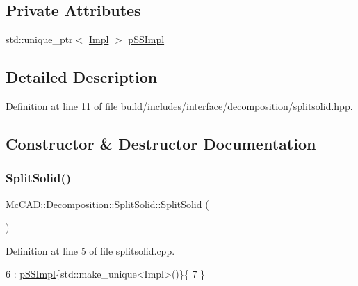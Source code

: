 \subsection*{Private Attributes}
\begin{DoxyCompactItemize}
\item 
std\+::unique\+\_\+ptr$<$ \hyperlink{classMcCAD_1_1Decomposition_1_1SplitSolid_1_1Impl}{Impl} $>$ \hyperlink{classMcCAD_1_1Decomposition_1_1SplitSolid_a9ae605a91ed830bea7ad866d758743ab}{p\+S\+S\+Impl}
\end{DoxyCompactItemize}


\subsection{Detailed Description}


Definition at line 11 of file build/includes/interface/decomposition/splitsolid.\+hpp.



\subsection{Constructor \& Destructor Documentation}
\mbox{\label{classMcCAD_1_1Decomposition_1_1SplitSolid_af0d38951f19a252ec24a48efa3d4a619}} 
\subsubsection{\texorpdfstring{Split\+Solid()}{SplitSolid()}\hspace{0.1cm}{\footnotesize\ttfamily [1/2]}}
{\footnotesize\ttfamily Mc\+C\+A\+D\+::\+Decomposition\+::\+Split\+Solid\+::\+Split\+Solid (\begin{DoxyParamCaption}{ }\end{DoxyParamCaption})}



Definition at line 5 of file splitsolid.\+cpp.


\begin{DoxyCode}
6   : \hyperlink{classMcCAD_1_1Decomposition_1_1SplitSolid_a9ae605a91ed830bea7ad866d758743ab}{pSSImpl}\{std::make\_unique<Impl>()\}\{
7 \}
\end{DoxyCode}
\mbox{\label{classMcCAD_1_1Decomposition_1_1SplitSolid_a5f6fb2bf7319779b37c408759b1117ca}} 
